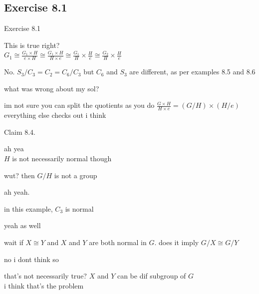 \documentclass[15pt]{scrartcl}
\begin{document}
\subsection{Exercise 8.1}
\begin{discussion*}Exercise 8.1
    \begin{abboy*}
        This is true right?
        \\
        $G_1\cong \frac{G_1\times H}{{e}\times H} \cong \frac{G_1\times H}{H\times {e}}\cong \frac{G_1}{H}\times \frac{H}{{e}}\cong \frac{G_2}{H}\times \frac{H}{{e}}$ 
    \end{abboy*}
    \begin{arthur*}
        No. $S_3/C_3 = C_2 = C_6/C_3$ but $C_6$ and $S_3$ are different, as per examples 8.5 and 8.6
    \end{arthur*}
    \begin{abboy*}
        what was wrong about my sol?
    \end{abboy*}
    \begin{arthur*}
        im not sure you can split the quotients as you do $\frac{G \times H}{H \times e} =(G /H) \times (H/e)$
        \\
        everything else checks out i think
    \end{arthur*}
    \begin{abboy*}
        Claim 8.4.
    \end{abboy*}
    \begin{arthur*}
        ah yea
        \\
        $H$ is not necessarily normal though
    \end{arthur*}
    \begin{abboy*}
        wut? then $G/H$ is not a group
    \end{abboy*}
    \begin{arthur*}
        ah yeah.
    \end{arthur*}
    \begin{abboy*}
        in this example, $C_3$ is normal
    \end{abboy*}
    \begin{arthur*}
        yeah as well
    \end{arthur*}
    \begin{abboy*}
        wait if $X\cong Y$ and $X$ and $Y$ are both normal in $G$. does it imply $G/X \cong G/Y$
    \end{abboy*}
    \begin{arthur*}
        no i dont think so
    \end{arthur*}
    \begin{abboy*}
        that's not necessarily true? $X$ and $Y$ can be dif subgroup of $G$
        \\
        i think that's the problem


\end{abboy*}
\end{discussion*}
\end{document}
